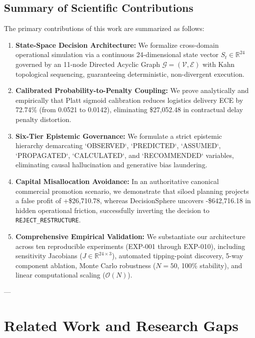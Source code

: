 \documentclass[journal]{IEEEtran}
\begin{document}
\subsection{Summary of Scientific Contributions}
The primary contributions of this work are summarized as follows:
\begin{enumerate}
    \item \textbf{State-Space Decision Architecture:} We formalize cross-domain operational simulation via a continuous 24-dimensional state vector $S_t \in \mathbb{R}^{24}$ governed by an 11-node Directed Acyclic Graph $\mathcal{G} = (\mathcal{V}, \mathcal{E})$ with Kahn topological sequencing, guaranteeing deterministic, non-divergent execution.
    \item \textbf{Calibrated Probability-to-Penalty Coupling:} We prove analytically and empirically that Platt sigmoid calibration reduces logistics delivery ECE by 72.74\% (from 0.0521 to 0.0142), eliminating \$27,052.48 in contractual delay penalty distortion.
    \item \textbf{Six-Tier Epistemic Governance:} We formulate a strict epistemic hierarchy demarcating `OBSERVED`, `PREDICTED`, `ASSUMED`, `PROPAGATED`, `CALCULATED`, and `RECOMMENDED` variables, eliminating causal hallucination and generative bias laundering.
    \item \textbf{Capital Misallocation Avoidance:} In an authoritative canonical commercial promotion scenario, we demonstrate that siloed planning projects a false profit of +\$26,710.78, whereas DecisionSphere uncovers -\$642,716.18 in hidden operational friction, successfully inverting the decision to \texttt{REJECT\_RESTRUCTURE}.
    \item \textbf{Comprehensive Empirical Validation:} We substantiate our architecture across ten reproducible experiments (EXP-001 through EXP-010), including sensitivity Jacobians ($J \in \mathbb{R}^{24 \times 3}$), automated tipping-point discovery, 5-way component ablation, Monte Carlo robustness ($N=50$, 100\% stability), and linear computational scaling ($\mathcal{O}(N)$).
\end{enumerate}

---

\section{Related Work and Research Gaps}
\end{document}
